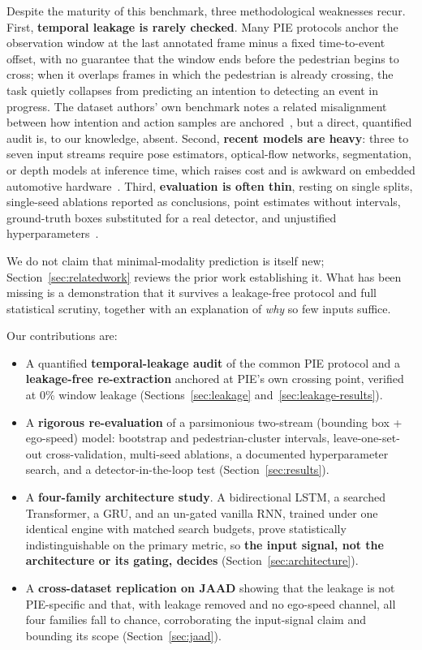 \documentclass[mti,article,submit,moreauthors]{Definitions/mdpi}
\begin{document}
Despite the maturity of this benchmark, three methodological weaknesses recur. First, \textbf{temporal leakage is rarely checked}. Many PIE protocols anchor the observation window at the last annotated frame minus a fixed time-to-event offset, with no guarantee that the window ends before the pedestrian begins to cross; when it overlaps frames in which the pedestrian is already crossing, the task quietly collapses from predicting an intention to detecting an event in progress. The dataset authors' own benchmark notes a related misalignment between how intention and action samples are anchored~\citep{rasouli2024diving}, but a direct, quantified audit is, to our knowledge, absent. Second, \textbf{recent models are heavy}: three to seven input streams require pose estimators, optical-flow networks, segmentation, or depth models at inference time, which raises cost and is awkward on embedded automotive hardware~\citep{azarmi2025pipnet,xie2025gtranspdm}. Third, \textbf{evaluation is often thin}, resting on single splits, single-seed ablations reported as conclusions, point estimates without intervals, ground-truth boxes substituted for a real detector, and unjustified hyperparameters~\citep{rasouli2024diving,azarmi2024featureimportance}.

We do not claim that minimal-modality prediction is itself new; Section~\ref{sec:relatedwork} reviews the prior work establishing it. What has been missing is a demonstration that it survives a leakage-free protocol and full statistical scrutiny, together with an explanation of \emph{why} so few inputs suffice.

Our contributions are:
\begin{itemize}
\item A quantified \textbf{temporal-leakage audit} of the common PIE protocol and a \textbf{leakage-free re-extraction} anchored at PIE's own crossing point, verified at 0\% window leakage (Sections~\ref{sec:leakage} and~\ref{sec:leakage-results}).
\item A \textbf{rigorous re-evaluation} of a parsimonious two-stream (bounding box + ego-speed) model: bootstrap and pedestrian-cluster intervals, leave-one-set-out cross-validation, multi-seed ablations, a documented hyperparameter search, and a detector-in-the-loop test (Section~\ref{sec:results}).
\item A \textbf{four-family architecture study}. A bidirectional LSTM, a searched Transformer, a GRU, and an un-gated vanilla RNN, trained under one identical engine with matched search budgets, prove statistically indistinguishable on the primary metric, so \textbf{the input signal, not the architecture or its gating, decides} (Section~\ref{sec:architecture}).
\item A \textbf{cross-dataset replication on JAAD} showing that the leakage is not PIE-specific and that, with leakage removed and no ego-speed channel, all four families fall to chance, corroborating the input-signal claim and bounding its scope (Section~\ref{sec:jaad}).
\end{itemize}
\end{document}
